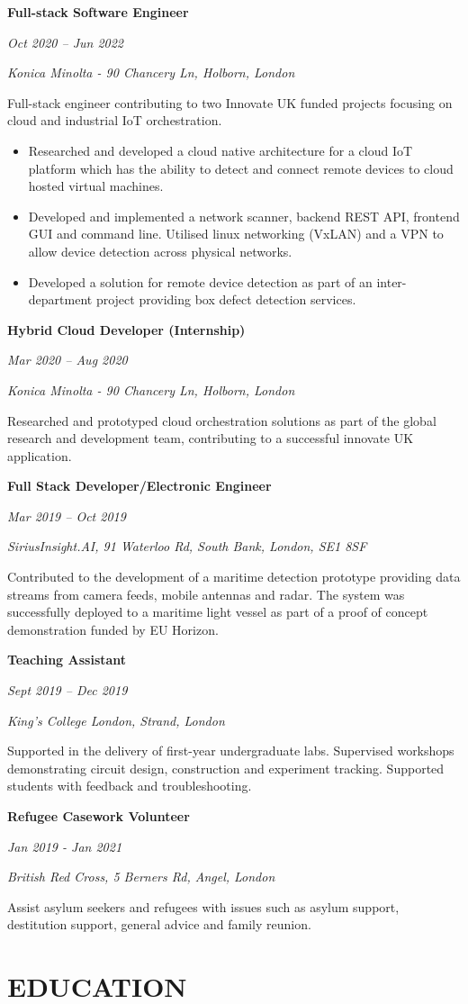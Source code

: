 \documentclass[11pt,a4paper]{article}
\newcommand{\cventry}[5]{
    \noindent
    \begin{minipage}[t]{0.3\textwidth}
        \raggedright
        \textbf{#1}
        
        \textit{#2}
    \end{minipage}%
    \hfill
    \begin{minipage}[t]{0.7\textwidth}
        \raggedright
        \textit{#3}
        
        #4
        
        #5
    \end{minipage}
    
    \vspace{8pt}
}
\begin{document}
\cventry{Full-stack Software Engineer}{Oct 2020 – Jun 2022}{Konica Minolta - 90 Chancery Ln, Holborn, London}{}{
Full-stack engineer contributing to two Innovate UK funded projects focusing on cloud and industrial IoT orchestration.
\begin{itemize}[leftmargin=15pt, itemsep=2pt]
    \item Researched and developed a cloud native architecture for a cloud IoT platform which has the ability to detect and connect remote devices to cloud hosted virtual machines.
    \item Developed and implemented a network scanner, backend REST API, frontend GUI and command line. Utilised linux networking (VxLAN) and a VPN to allow device detection across physical networks.
    \item Developed a solution for remote device detection as part of an inter-department project providing box defect detection services.
\end{itemize}
}

\cventry{Hybrid Cloud Developer (Internship)}{Mar 2020 – Aug 2020}{Konica Minolta - 90 Chancery Ln, Holborn, London}{}{
Researched and prototyped cloud orchestration solutions as part of the global research and development team, contributing to a successful innovate UK application.
}

\cventry{Full Stack Developer/Electronic Engineer}{Mar 2019 – Oct 2019}{SiriusInsight.AI, 91 Waterloo Rd, South Bank, London, SE1 8SF}{}{
Contributed to the development of a maritime detection prototype providing data streams from camera feeds, mobile antennas and radar. The system was successfully deployed to a maritime light vessel as part of a proof of concept demonstration funded by EU Horizon.
}

\cventry{Teaching Assistant}{Sept 2019 – Dec 2019}{King's College London, Strand, London}{}{
Supported in the delivery of first-year undergraduate labs. Supervised workshops demonstrating circuit design, construction and experiment tracking. Supported students with feedback and troubleshooting.
}

\cventry{Refugee Casework Volunteer}{Jan 2019 - Jan 2021}{British Red Cross, 5 Berners Rd, Angel, London}{}{
Assist asylum seekers and refugees with issues such as asylum support, destitution support, general advice and family reunion.
}

\section{EDUCATION}
\end{document}
